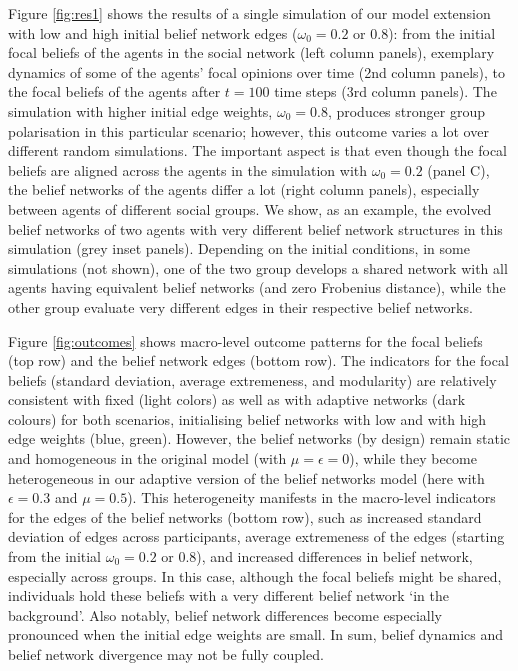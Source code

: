 Figure \ref{fig:res1} shows the results of a single simulation of our model extension with low and high initial belief network edges ($\omega_0=0.2$ or $0.8$): from the initial focal beliefs of the agents in the social network (left column panels), exemplary dynamics of some of the agents' focal opinions over time (2nd column panels), to the focal beliefs of the agents after $t=100$ time steps (3rd column panels). The simulation with higher initial edge weights, $\omega_0=0.8$, produces stronger group polarisation in this particular scenario; however, this outcome varies a lot over different random simulations. The important aspect is that even though the focal beliefs are aligned across the agents in the simulation with $\omega_0=0.2$ (panel C), the belief networks of the agents differ a lot (right column panels), especially between agents of different social groups. We show, as an example, the evolved belief networks of two agents with very different belief network structures in this simulation (grey inset panels). Depending on the initial conditions, in some simulations (not shown), one of the two group develops a shared network with all agents having equivalent belief networks (and zero Frobenius distance), while the other group evaluate very different edges in their respective belief networks.  

Figure \ref{fig:outcomes} shows macro-level outcome patterns for the focal beliefs (top row) and the belief network edges (bottom row). The indicators for the focal beliefs (standard deviation, average extremeness, and modularity) are relatively consistent with fixed (light colors) as well as with adaptive networks (dark colours) for both scenarios, initialising belief networks with low and with high edge weights (blue, green). However, the belief networks (by design) remain static and homogeneous in the original model (with $\mu=\epsilon=0$), while they become heterogeneous in our adaptive version of the belief networks model (here with $\epsilon=0.3$ and $\mu=0.5$). This heterogeneity manifests in the macro-level indicators for the edges of the belief networks (bottom row), such as increased standard deviation of edges across participants, average extremeness of the edges (starting from the initial $\omega_{0} = 0.2$ or $0.8$), and increased differences in belief network, especially across groups. In this case, although the focal beliefs might be shared, individuals hold these beliefs with a very different belief network `in the background'. Also notably, belief network differences become especially pronounced when the initial edge weights are small. In sum, belief dynamics and belief network divergence may not be fully coupled. 


